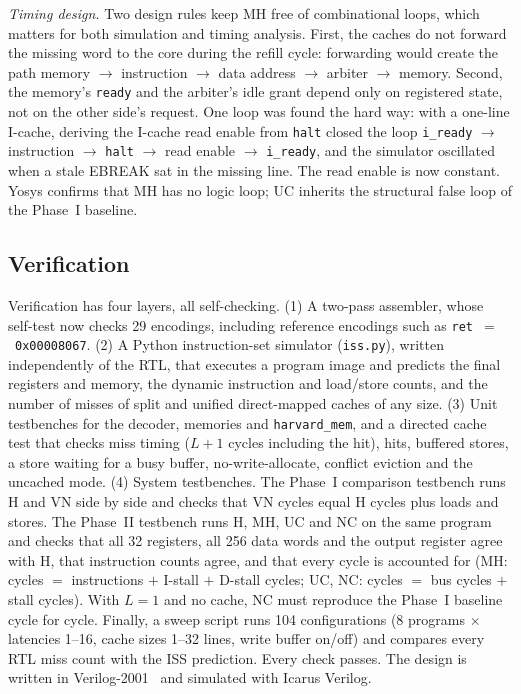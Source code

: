 \documentclass[conference]{IEEEtran}
\begin{document}
\emph{Timing design.} Two design rules keep MH free of combinational loops,
which matters for both simulation and timing analysis. First, the caches do
not forward the missing word to the core during the refill cycle: forwarding
would create the path memory $\rightarrow$ instruction $\rightarrow$ data
address $\rightarrow$ arbiter $\rightarrow$ memory. Second, the memory's
\texttt{ready} and the arbiter's idle grant depend only on registered state,
not on the other side's request. One loop was found the hard way: with a
one-line I-cache, deriving the I-cache read enable from \texttt{halt} closed
the loop \texttt{i\_ready} $\rightarrow$ instruction $\rightarrow$
\texttt{halt} $\rightarrow$ read enable $\rightarrow$ \texttt{i\_ready}, and
the simulator oscillated when a stale EBREAK sat in the missing line. The
read enable is now constant. Yosys confirms that MH has no logic loop; UC
inherits the structural false loop of the Phase~I baseline.

\subsection{Verification}
Verification has four layers, all self-checking.
(1) A two-pass assembler, whose self-test now checks 29 encodings, including
reference encodings such as \texttt{ret}~$=$~\texttt{0x00008067}.
(2) A Python instruction-set simulator (\texttt{iss.py}), written
independently of the RTL, that executes a program image and predicts the
final registers and memory, the dynamic instruction and load/store counts,
and the number of misses of split and unified direct-mapped caches of any
size.
(3) Unit testbenches for the decoder, memories and \texttt{harvard\_mem}, and
a directed cache test that checks miss timing ($L{+}1$ cycles including the
hit), hits, buffered stores, a store waiting for a busy buffer,
no-write-allocate, conflict eviction and the uncached mode.
(4) System testbenches. The Phase~I comparison testbench runs H and VN side by
side and checks that VN cycles equal H cycles plus loads and stores. The
Phase~II testbench runs H, MH, UC and NC on the same program and checks that
all 32 registers, all 256 data words and the output register agree with H,
that instruction counts agree, and that every cycle is accounted for (MH:
cycles $=$ instructions $+$ I-stall $+$ D-stall cycles; UC, NC: cycles $=$
bus cycles $+$ stall cycles). With $L=1$ and no cache, NC must reproduce the
Phase~I baseline cycle for cycle. Finally, a sweep script runs 104
configurations (8 programs $\times$ latencies 1--16, cache sizes 1--32
lines, write buffer on/off) and compares every RTL miss count with the
ISS prediction. Every check passes. The design is written in
Verilog-2001~\cite{ieee1364} and simulated with Icarus Verilog.
\end{document}
